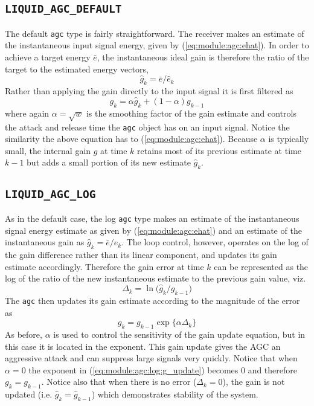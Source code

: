 \subsection{{\tt LIQUID\_AGC\_DEFAULT}}
\label{module:agc:default}
The default {\tt agc} type is fairly straightforward.
The receiver makes an estimate of the instantaneous input signal energy, given
by (\ref{eq:module:agc:ehat}).
In order to achieve a target energy $\bar{e}$, the instantaneous ideal gain is
therefore the ratio of the target to the estimated energy vectors,
\[
    \hat{g}_k = \bar{e} / \hat{e}_k
\]
Rather than applying the gain directly to the input signal it is first
filtered as
\[
    g_k = \alpha \hat{g}_k + (1-\alpha) g_{k-1}
\]
where again $\alpha = \sqrt{w}$ is the smoothing factor of the gain estimate
and controls the attack and release time the {\tt agc} object has on an input
signal.
Notice the similarity the above equation has to (\ref{eq:module:agc:ehat}).
Because $\alpha$ is typically small, the internal gain $g$ at time $k$ retains
most of its previous estimate at time $k-1$ but adds a small portion of its
new estimate $\hat{g}_k$.

\subsection{{\tt LIQUID\_AGC\_LOG}}
\label{module:agc:log}
As in the default case, the log {\tt agc} type makes an estimate of the
instantaneous signal energy estimate as given by (\ref{eq:module:agc:ehat})
and an estimate of the instantaneous gain as
$\hat{g}_k = \bar{e} / \hat{e}_k$.
The loop control, however, operates on the log of the gain difference rather
than its linear component, and updates its gain estimate accordingly.
Therefore the gain error at time $k$ can be represented as the log of the
ratio of the new instantaneous estimate to the previous gain value, viz.
\[
    \Delta_k = \ln\bigl( \hat{g}_k / g_{k-1} \bigr)
\]
The {\tt agc} then updates its gain estimate according to the magnitude of the
error as
%
\begin{equation}
\label{eq:module:agc:log:g_update}
    g_k = g_{k-1} \exp\bigl\{ \alpha \Delta_k \bigr\}
\end{equation}
%
As before, $\alpha$ is used to control the sensitivity of the gain update
equation, but in this case it is located in the exponent.
This gain update gives the AGC an aggressive attack and can suppress large
signals very quickly.
Notice that when $\alpha=0$ the exponent in (\ref{eq:module:agc:log:g_update})
becomes $0$ and therefore $g_k = g_{k-1}$.
Notice also that when there is no error ($\Delta_k=0$), the gain is not updated
(i.e. $\hat{g}_k = \hat{g}_{k-1}$) which demonstrates stability of the system.

